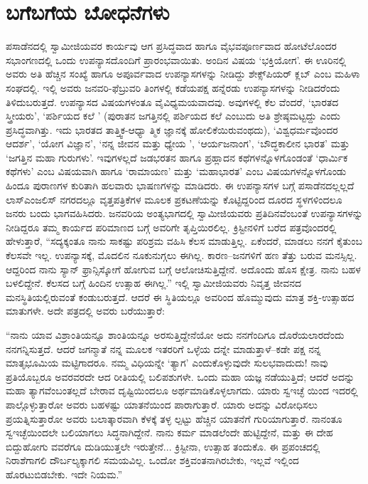 
\chapter{ಬಗೆಬಗೆಯ ಬೋಧನೆಗಳು}

\noindent

ಪಸಾಡೆನದಲ್ಲಿ ಸ್ವಾಮೀಜಿಯವರ ಕಾರ್ಯವು ಆಗ ಪ್ರಸಿದ್ಧವಾದ ಹಾಗೂ ವೈಭವಪೂರ್ಣವಾದ ಹೋಟೆಲೊಂದರ ಸಭಾಂಗಣದಲ್ಲಿ ಒಂದು ಉಪನ್ಯಾಸದೊಂದಿಗೆ ಪ್ರಾರಂಭವಾಯಿತು. ಅಂದಿನ ವಿಷಯ ‘ಭಕ್ತಿಯೋಗ’. ಈ ಊರಿನಲ್ಲಿ ಅವರು ಅತಿ ಹೆಚ್ಚಿನ ಸಂಖ್ಯೆ ಹಾಗೂ ಅಪೂರ್ವವಾದ ಉಪನ್ಯಾಸಗಳನ್ನು ನೀಡಿದ್ದು ಶೇಕ್ಸ್​ಪಿಯರ್ ಕ್ಲಬ್ ಎಂಬ ಮಹಿಳಾ ಸಂಘದಲ್ಲಿ. ಇಲ್ಲಿ ಅವರು ಜನವರಿ-ಫೆಬ್ರುವರಿ ತಿಂಗಳಲ್ಲಿ ಕಡೆಯಪಕ್ಷ ಹನ್ನೆರಡು ಉಪನ್ಯಾಸಗಳನ್ನು ನೀಡಿದರೆಂದು ತಿಳಿದುಬರುತ್ತದೆ. ಉಪನ್ಯಾಸದ ವಿಷಯಗಳಂತೂ ವೈವಿಧ್ಯಮಯವಾದವು. ಅವುಗಳಲ್ಲಿ ಕೆಲ ವೆಂದರೆ, ‘ಭಾರತದ ಸ್ತ್ರೀಯರು’, ‘ಪರ್ಶಿಯದ ಕಲೆ ’ (ಪುರಾತನ ಜಗತ್ತಿನಲ್ಲಿ ಪರ್ಶಿಯದ ಕಲೆ ಎಂಬುದು ಅತಿ ಶ್ರೇಷ್ಠಮಟ್ಟದ್ದು ಎಂದು ಪ್ರಸಿದ್ಧವಾಗಿತ್ತು. ಇದು ಭಾರತದ ತಾತ್ತ್ವಿಕ-ಆಧ್ಯಾ ತ್ಮಿಕ ಜ್ಞಾನಕ್ಕೆ ಹೋಲಿಕೆಯಿರುವಂಥದು), ‘ವಿಶ್ವಧರ್ಮವೊಂದರ ಆದರ್ಶ’, ‘ಯೋಗ ವಿಜ್ಞಾನ’, ‘ನನ್ನ ಜೀವನ ಮತ್ತು ಧ್ಯೇಯ ’, ‘ಆರ್ಯಜನಾಂಗ’, ‘ಬೌದ್ಧಕಾಲೀನ ಭಾರತ’ ಮತ್ತು ‘ಜಗತ್ತಿನ ಮಹಾ ಗುರುಗಳು’. ಇವುಗಳಲ್ಲದೆ ಜಡಭರತನ ಹಾಗೂ ಪ್ರಹ್ಲಾದನ ಕಥೆಗಳನ್ನೊಳಗೊಂಡಂತೆ ‘ಧಾರ್ಮಿಕ ಕಥೆಗಳು’ ಎಂಬ ವಿಷಯವಾಗಿ ಹಾಗೂ ‘ರಾಮಾಯಣ’ ಮತ್ತು ‘ಮಹಾಭಾರತ’ ಎಂಬ ವಿಷಯಗಳನ್ನೊಳಗೊಂಡು ಹಿಂದೂ ಪುರಾಣಗಳ ಕುರಿತಾಗಿ ಹಲವಾರು ಭಾಷಣಗಳನ್ನು ಮಾಡಿದರು. ಈ ಉಪನ್ಯಾಸಗಳ ಬಗ್ಗೆ ಪಸಾಡೆನದಲ್ಲಲ್ಲದೆ ಲಾಸ್​ಎಂಜಲಿಸ್ ನಗರದಲ್ಲೂ ವೃತ್ತಪತ್ರಿಕೆಗಳ ಮೂಲಕ ಪ್ರಕಟಣೆಯನ್ನು ಕೊಟ್ಟಿದ್ದರಿಂದ ದೂರದ ಸ್ಥಳಗಳಿಂದಲೂ ಜನರು ಬಂದು ಭಾಗವಹಿಸಿದರು. ಜನವರಿಯ ಅಂತ್ಯಭಾಗದಲ್ಲಿ ಸ್ವಾಮೀಜಿಯವರು ಪ್ರತಿದಿನವೆಂಬಂತೆ ಉಪನ್ಯಾಸಗಳನ್ನು ನೀಡಿದ್ದರೂ ತಮ್ಮ ಕಾರ್ಯದ ಪರಿಮಾಣದ ಬಗ್ಗೆ ಅವರಿಗೇ ತೃಪ್ತಿಯಿರಲಿಲ್ಲ. ಕ್ರಿಸ್ಟೀನಳಿಗೆ ಬರೆದ ಪತ್ರವೊಂದರಲ್ಲಿ ಹೇಳುತ್ತಾರೆ, “ಸದ್ಯಕ್ಕಂತೂ ನಾನು ಸಾಕಷ್ಟು ಪರಿಶ್ರಮ ವಹಿಸಿ ಕೆಲಸ ಮಾಡುತ್ತಿಲ್ಲ. ಏಕೆಂದರೆ, ಮಾಡಲು ನನಗೆ ಕೈತುಂಬ ಕೆಲಸವೇ ಇಲ್ಲ. ಉಪನ್ಯಾಸಕ್ಕೆ, ಮೊದಲಿನ ನೂಕುನುಗ್ಗಲು ಈಗಿಲ್ಲ. ಕಾರಣ–ಜನಗಳಿಗೆ ಹಣ ತೆತ್ತು ಬರುವ ಮನಸ್ಸಿಲ್ಲ. ಆದ್ದರಿಂದ ನಾನು ಸ್ಯಾನ್ ಫ್ರಾನ್ಸಿಸ್ಕೋಗೆ ಹೋಗುವ ಬಗ್ಗೆ ಆಲೋಚಿಸುತ್ತಿದ್ದೇನೆ. ಅದೊಂದು ಹೊಸ ಕ್ಷೇತ್ರ. ನಾನು ಬಹಳ ಬಳಲಿದ್ದೇನೆ. ಕೆಲಸದ ಬಗ್ಗೆ ಹಿಂದಿನ ಉತ್ಸಾಹ ಈಗಿಲ್ಲ.” ಇಲ್ಲಿ ಸ್ವಾಮೀಜಿಯವರು ನಿವೃತ್ತ ಜೀವನದ ಮನಸ್ಥಿತಿಯಲ್ಲಿರುವಂತೆ ಕಂಡುಬರುತ್ತದೆ. ಆದರೆ ಈ ಸ್ಥಿತಿಯಲ್ಲೂ ಅವರಿಂದ ಹೊಮ್ಮುವುದು ಮಾತ್ರ ಶಕ್ತಿ-ಉತ್ಸಾಹದ ಮಾತುಗಳೇ. ಅದೇ ಪತ್ರದಲ್ಲಿ ಅವರು ಬರೆಯುತ್ತಾರೆ:

“ನಾನು ಯಾವ ವಿಶ್ರಾಂತಿಯನ್ನೂ ಶಾಂತಿಯನ್ನೂ ಅರಸುತ್ತಿದ್ದೇನೆಯೋ ಅದು ನನಗೆಂದಿಗೂ ದೊರೆಯಲಾರದೆಂದು ನನಗನ್ನಿಸುತ್ತದೆ. ಆದರೆ ಜಗನ್ಮಾತೆ ನನ್ನ ಮೂಲಕ ಇತರರಿಗೆ ಒಳ್ಳೆಯ ದನ್ನೇ ಮಾಡುತ್ತಾಳೆ–ಕಡೇ ಪಕ್ಷ ನನ್ನ ಮಾತೃಭೂಮಿಯ ಮಟ್ಟಿಗಾದರೂ. ನಮ್ಮ ವಿಧಿಯನ್ನೇ ‘ತ್ಯಾಗ’ ಎಂದುಕೊಳ್ಳುವುದೇ ಸುಲಭವಾದುದು! ನಾವು ಪ್ರತಿಯೊಬ್ಬರೂ ಅವರವರದೇ ಆದ ರೀತಿಯಲ್ಲಿ ಬಲಿಪಶುಗಳೇ. ಒಂದು ಮಹಾ ಯಜ್ಞ ನಡೆಯುತ್ತಿದೆ; ಆದರೆ ಅದನ್ನು ಮಹಾ ತ್ಯಾಗವೆಂಬಂತಲ್ಲದೆ ಬೇರಾವ ದೃಷ್ಟಿಯಿಂದಲೂ ಅರ್ಥಮಾಡಿಕೊಳ್ಳಲಾಗದು. ಯಾರು ಸ್ವಇಚ್ಛೆ ಯಿಂದ ಇದರಲ್ಲಿ ಪಾಲ್ಗೊಳ್ಳುತ್ತಾರೋ ಅವರು ಬಹಳಷ್ಟು ಯಾತನೆಯಿಂದ ಪಾರಾಗುತ್ತಾರೆ. ಯಾರು ಅದನ್ನು ವಿರೋಧಿಸಲು ಪ್ರಯತ್ನಿಸುತ್ತಾರೋ ಅವರು ಬಲಾತ್ಕಾರವಾಗಿ ಕೆಳಕ್ಕೆ ತಳ್ಳ ಲ್ಪಟ್ಟು ಹೆಚ್ಚಿನ ಯಾತನೆಗೆ ಗುರಿಯಾಗುತ್ತಾರೆ. ನಾನಂತೂ ಸ್ವಇಚ್ಛೆಯಿಂದಲೇ ಬಲಿಯಾಗಲು ಸಿದ್ಧನಾಗಿದ್ದೇನೆ. ನಾನು ಕರ್ಮ ಮಾಡಲೆಂದೇ ಹುಟ್ಟಿದ್ದೇನೆ, ಮತ್ತು ಈ ದೇಹ ಬಿದ್ದುಹೋಗು ವವರೆಗೂ ದುಡಿಯುತ್ತಲೇ ಇರುತ್ತೇನೆ... ಕ್ರಿಸ್ಟೀನಾ, ಉತ್ಸಾಹ ತಂದುಕೊ. ಈ ಪ್ರಪಂಚದಲ್ಲಿ ನಿರಾಶೆಗಾಗಲಿ ದೌರ್ಬಲ್ಯಕ್ಕಾಗಲಿ ಸಮಯವಿಲ್ಲ. ಒಂದೋ ಶಕ್ತಿವಂತನಾಗಿರಬೇಕು, ಇಲ್ಲವೆ ಇಲ್ಲಿಂದ ಹೊರಟುಬಿಡಬೇಕು. ಇದೇ ನಿಯಮ.”

